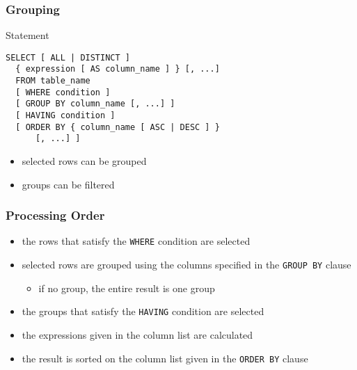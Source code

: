 \documentclass[dvipsnames]{beamer}
\theoremstyle{plain}
\begin{document}
\begin{frame}[fragile]
  \frametitle{Grouping}

  \begin{block}{Statement}
    \begin{lstlisting}
SELECT [ ALL | DISTINCT ]
  { expression [ AS column_name ] } [, ...]
  FROM table_name
  [ WHERE condition ]
  [ GROUP BY column_name [, ...] ]
  [ HAVING condition ]
  [ ORDER BY { column_name [ ASC | DESC ] }
      [, ...] ]
    \end{lstlisting}
  \end{block}

  \pause
  \begin{itemize}
    \item selected rows can be grouped
    \item groups can be filtered
  \end{itemize}
\end{frame}

\begin{frame}
  \frametitle{Processing Order}

  \begin{itemize}
    \item the rows that satisfy the \lstinline!WHERE! condition are selected

    \pause
    \item selected rows are grouped using the columns specified in the
      \lstinline!GROUP BY! clause
    \begin{itemize}
      \item if no group, the entire result is one group
    \end{itemize}

    \pause
    \item the groups that satisfy the \lstinline!HAVING! condition are selected

    \pause
    \item the expressions given in the column list are calculated

    \pause
    \item the result is sorted on the column list given in the
      \lstinline!ORDER BY! clause
  \end{itemize}
\end{frame}
\end{document}
